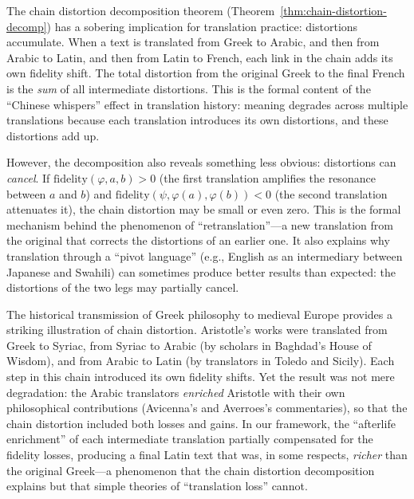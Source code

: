 \begin{interpretation}
\label{interp:chinese-whispers}
The chain distortion decomposition theorem (Theorem~\ref{thm:chain-distortion-decomp}) has a sobering implication for translation practice: distortions accumulate.  When a text is translated from Greek to Arabic, and then from Arabic to Latin, and then from Latin to French, each link in the chain adds its own fidelity shift.  The total distortion from the original Greek to the final French is the \emph{sum} of all intermediate distortions.  This is the formal content of the ``Chinese whispers'' effect in translation history: meaning degrades across multiple translations because each translation introduces its own distortions, and these distortions add up.

However, the decomposition also reveals something less obvious: distortions can \emph{cancel}.  If $\mathrm{fidelity}(\varphi, a, b) > 0$ (the first translation amplifies the resonance between $a$ and $b$) and $\mathrm{fidelity}(\psi, \varphi(a), \varphi(b)) < 0$ (the second translation attenuates it), the chain distortion may be small or even zero.  This is the formal mechanism behind the phenomenon of ``retranslation''---a new translation from the original that corrects the distortions of an earlier one.  It also explains why translation through a ``pivot language'' (e.g., English as an intermediary between Japanese and Swahili) can sometimes produce better results than expected: the distortions of the two legs may partially cancel.
\end{interpretation}

\begin{remark}
The historical transmission of Greek philosophy to medieval Europe provides a striking illustration of chain distortion.  Aristotle's works were translated from Greek to Syriac, from Syriac to Arabic (by scholars in Baghdad's House of Wisdom), and from Arabic to Latin (by translators in Toledo and Sicily).  Each step in this chain introduced its own fidelity shifts.  Yet the result was not mere degradation: the Arabic translators \emph{enriched} Aristotle with their own philosophical contributions (Avicenna's and Averroes's commentaries), so that the chain distortion included both losses and gains.  In our framework, the ``afterlife enrichment'' of each intermediate translation partially compensated for the fidelity losses, producing a final Latin text that was, in some respects, \emph{richer} than the original Greek---a phenomenon that the chain distortion decomposition explains but that simple theories of ``translation loss'' cannot.
\end{remark}

